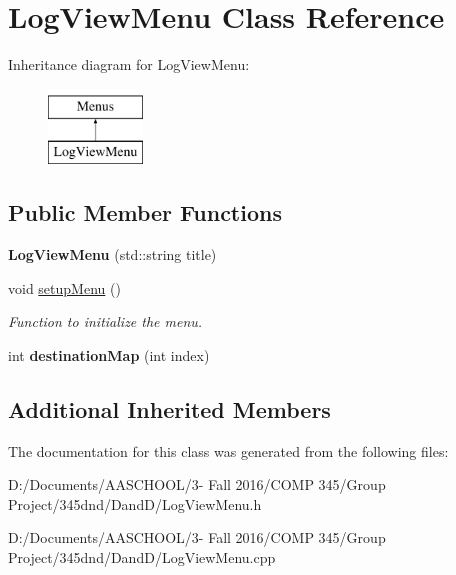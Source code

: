 \hypertarget{class_log_view_menu}{}\section{Log\+View\+Menu Class Reference}
\label{class_log_view_menu}
Inheritance diagram for Log\+View\+Menu\+:\begin{figure}[H]
\begin{center}
\leavevmode
\includegraphics[height=2.000000cm]{class_log_view_menu}
\end{center}
\end{figure}
\subsection*{Public Member Functions}
\begin{DoxyCompactItemize}
\item 
\hypertarget{class_log_view_menu_a819ade1a1b94e20d7aef79e385a476c9}{}\label{class_log_view_menu_a819ade1a1b94e20d7aef79e385a476c9} 
{\bfseries Log\+View\+Menu} (std\+::string title)
\item 
\hypertarget{class_log_view_menu_aaa517c9da1716043db1a92216d692999}{}\label{class_log_view_menu_aaa517c9da1716043db1a92216d692999} 
void \hyperlink{class_log_view_menu_aaa517c9da1716043db1a92216d692999}{setup\+Menu} ()
\begin{DoxyCompactList}\small\item\em Function to initialize the menu. \end{DoxyCompactList}\item 
\hypertarget{class_log_view_menu_a9bbd7c836cdaf50d30f9dc0b2f474a45}{}\label{class_log_view_menu_a9bbd7c836cdaf50d30f9dc0b2f474a45} 
int {\bfseries destination\+Map} (int index)
\end{DoxyCompactItemize}
\subsection*{Additional Inherited Members}


The documentation for this class was generated from the following files\+:\begin{DoxyCompactItemize}
\item 
D\+:/\+Documents/\+A\+A\+S\+C\+H\+O\+O\+L/3-\/ Fall 2016/\+C\+O\+M\+P 345/\+Group Project/345dnd/\+Dand\+D/Log\+View\+Menu.\+h\item 
D\+:/\+Documents/\+A\+A\+S\+C\+H\+O\+O\+L/3-\/ Fall 2016/\+C\+O\+M\+P 345/\+Group Project/345dnd/\+Dand\+D/Log\+View\+Menu.\+cpp\end{DoxyCompactItemize}
